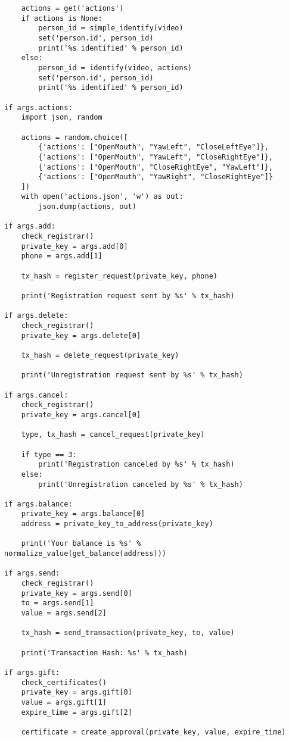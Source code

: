 \begin{verbatim}
    actions = get('actions')
    if actions is None:
        person_id = simple_identify(video)
        set('person.id', person_id)
        print('%s identified' % person_id)
    else:
        person_id = identify(video, actions)
        set('person.id', person_id)
        print('%s identified' % person_id)

if args.actions:
    import json, random

    actions = random.choice([
        {'actions': ["OpenMouth", "YawLeft", "CloseLeftEye"]},
        {'actions': ["OpenMouth", "YawLeft", "CloseRightEye"]},
        {'actions': ["OpenMouth", "CloseRightEye", "YawLeft"]},
        {'actions': ["OpenMouth", "YawRight", "CloseRightEye"]}
    ])
    with open('actions.json', 'w') as out:
        json.dump(actions, out)

if args.add:
    check_registrar()
    private_key = args.add[0]
    phone = args.add[1]

    tx_hash = register_request(private_key, phone)

    print('Registration request sent by %s' % tx_hash)

if args.delete:
    check_registrar()
    private_key = args.delete[0]

    tx_hash = delete_request(private_key)

    print('Unregistration request sent by %s' % tx_hash)

if args.cancel:
    check_registrar()
    private_key = args.cancel[0]

    type, tx_hash = cancel_request(private_key)

    if type == 3:
        print('Registration canceled by %s' % tx_hash)
    else:
        print('Unregistration canceled by %s' % tx_hash)

if args.balance:
    private_key = args.balance[0]
    address = private_key_to_address(private_key)

    print('Your balance is %s' % normalize_value(get_balance(address)))

if args.send:
    check_registrar()
    private_key = args.send[0]
    to = args.send[1]
    value = args.send[2]

    tx_hash = send_transaction(private_key, to, value)

    print('Transaction Hash: %s' % tx_hash)

if args.gift:
    check_certificates()
    private_key = args.gift[0]
    value = args.gift[1]
    expire_time = args.gift[2]

    certificate = create_approval(private_key, value, expire_time)


\end{verbatim}
